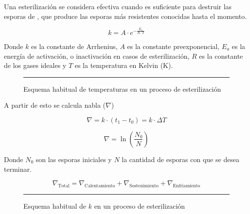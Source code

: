 
Una esterilización se considera efectiva cuando es suficiente para destruir las esporas de , que produce las esporas más resistentes conocidas hasta el momento.

\begin{equation}
    k = A \cdot e^{-\frac{E_{a}}{R \cdot T}}
\end{equation}

Donde $k$ es la constante de Arrhenius, $A$ es la constante preexponencial, $E_{a}$ es la energía de activación, o inactivación en casos de esterilización, $R$ es la constante de los gases ideales y $T$ es la temperatura en Kelvin (\unit{\kelvin}).

\begin{figure}\centering
    \resizebox{\linewidth}{!}{}
    \rule{\linewidth}{0.5pt}
    \caption{Esquema habitual de temperaturas en un proceso de esterilización}
    \label{fig:variacion_de_temperaturas_en_esterilizacion}
\end{figure}

A partir de esto se calcula nabla ($\nabla$)

\begin{equation}
    \nabla = k \cdot (t_{1} - t_{0}) = k \cdot \Delta T 
\end{equation}

\begin{equation}
    \nabla = \ln(\frac{N_{0}}{N})
\end{equation}

Donde $N_{0}$ son las esporas iniciales y $N$ la cantidad de esporas con que se desea terminar.

\begin{equation}
    \nabla_{\text{Total}} = \nabla_{\text{Calentamiento}} + \nabla_{\text{Sostenimiento}} + \nabla_{\text{Enfriamiento}}
\end{equation}

\begin{figure}\centering
    \resizebox{\linewidth}{!}{}
    \rule{\linewidth}{0.5pt}
    \caption{Esquema habitual de $k$ en un proceso de esterilización}
    \label{fig:variacion_de_k_en_esterilizacion}
\end{figure}




